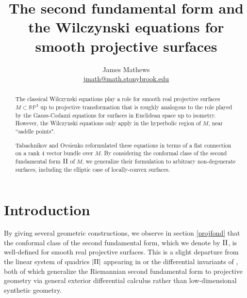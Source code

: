 \documentclass[11pt]{article}
\numberwithin{equation}{section}
\theoremstyle{plain}
\theoremstyle{remark}
\newcommand{\RP}{\mathbb{RP}}
\newcommand{\II}{\textnormal{II}}
\begin{document}
\title{The second fundamental form and the Wilczynski equations for smooth projective surfaces}
\author{\scriptsize James Mathews \vspace{-2ex}\\
\scriptsize \href{mailto:jmath@math.stonybrook.edu}{jmath@math.stonybrook.edu} \vspace{-2ex}\\
}
\date{}
\maketitle

\begin{abstract}
The classical Wilczynski equations \cite{wil} play a role for smooth real projective surfaces $M\subset \RP^3$ up to projective transformation that is roughly analogous to the role played by the Gauss-Codazzi equations for surfaces in Euclidean space up to isometry. However, the Wilczynski equations only apply in the hyperbolic region of $M$, near ``saddle points".

Tabachnikov and Ovsienko \cite{to} reformulated these equations in terms of a flat connection on a rank 4 vector bundle over $M$. By considering the conformal class of the second fundamental form $\II$ of $M$, we generalize their formulation to arbitrary non-degenerate surfaces, including the elliptic case of locally-convex surfaces.
\end{abstract}

\tableofcontents

\section{Introduction}

By giving several geometric constructions, we observe in section \ref{projfond} that the conformal class of the second fundamental form, which we denote by $\II$, is well-defined for smooth real projective surfaces. This is a slight departure from the linear system of quadrics $|\II|$ appearing in \cite{gh} or the differential invariants of \cite{ag}, both of which generalize the Riemannian second fundamental form to projective geometry via general exterior differential calculus rather than low-dimensional synthetic geometry.
\end{document}
